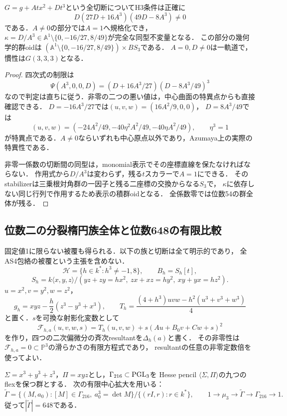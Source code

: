 \begin{corollary}[一係数方向の例外値と慣性を全て明示する]
\label{cor:clifford-axis-exact-cuts}
$G=g+A t x^2+Dt^3$という全切断についてH3条件は正確に
\[
 D(27D+16A^3)(49D-8A^3)\ne0
\]
である．$A\ne0$の部分では$A=1$へ規格化でき，
$\kappa=D/A^3\in\mathbb A^1\setminus\{0,-16/27,8/49\}$が完全な同型不変量となる．
この部分の幾何学的群oidは
$(\mathbb A^1\setminus\{0,-16/27,8/49\})\times BS_3$である．
$A=0,D\ne0$は一軌道で，慣性は$G(3,3,3)$となる．
\end{corollary}
\begin{proof}
四次式の制限は
\[
 \Psi(A^3,0,0,D)
 =(D+16A^3/27)(D-8A^3/49)^3
\]
なので判定は直ちに従う．非零の二つの悪い値は，中心曲面の特異点からも直接確認できる．
$D=-16A^3/27$では$(u,v,w)=(16A^2/9,0,0)$，
$D=8A^3/49$では
\[
 (u,v,w)=(-24A^2/49,-40\eta^2A^2/49,-40\eta A^2/49),\qquad\eta^3=1
\]
が特異点である．$A\ne0$ならいずれも中心原点以外であり，Azumaya上の実際の特異性である．

非零一係数の切断間の同型は，monomial表示でその座標直線を保たなければならない．
作用式から$D/A^3$は変わらず，残る$t$スカラーで$A=1$にできる．
そのstabilizerは三乗根対角群の一因子と残る二座標の交換からなる$S_3$で，
$\kappa$に依存しない同じ行列で作用するため表示の積群oidとなる．
全係数零では位数54の群全体が残る．
\end{proof}

\subsection{位数二の分裂楕円族全体と位数648の有限比較}
\label{sec:clifford-hesse-family}
固定値1に限らない被覆も得られる．以下の族と切断は全て明示的であり，
全AS4包絡の被覆という主張を含めない．
\[
 \mathcal H=\{h\in k^*:h^3\ne-1,8\},\qquad B_h=S_h[t],
\]
\[
 S_h=k\langle x,y,z\rangle/(yz+zy=h x^2,\ zx+xz=h y^2,\ xy+yx=h z^2).
\]
$u=x^2,v=y^2,w=z^2$，
\[
 g_h=xyz-\frac h2(z^3-y^3+x^3),\qquad
 T_h=\frac{(4+h^3)uvw-h^2(u^3+v^3+w^3)}4
\]
と置く．$s$を可換な射影化変数として
\[
 \mathcal F_{h,a}(u,v,w,s)
   =T_h(u,v,w)+s(Au+B_0v+Cw+s)^2
\]
を作り，四つの二次偏微分の斉次resultantを$\Delta_h(a)$と書く．
その非零性は$\mathcal F_{h,a}=0\subset\mathbb P^3$の滑らかさの有限方程式であり，
resultantの任意の非零定数倍を使ってよい．

$\Sigma=x^3+y^3+z^3$，$\Pi=xyz$とし，$\Gamma_{216}\subset\operatorname{PGL}_3$を
Hesse pencil $\langle\Sigma,\Pi\rangle$の九つのflexを保つ群とする．
次の有限中心拡大を用いる：
\[
 \widetilde\Gamma
 =\{(M,a_0):[M]\in\Gamma_{216},\ a_0^3=\det M\}
       /\{(rI,r):r\in k^*\},
 \qquad 1\to\mu_3\to\widetilde\Gamma\to\Gamma_{216}\to1.
\]
従って$|\widetilde\Gamma|=648$である．

